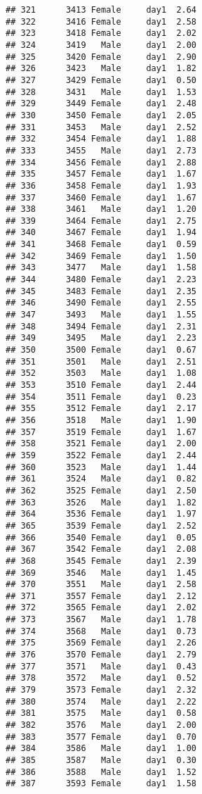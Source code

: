 \documentclass[
]{article}
\begin{document}
\begin{verbatim}
## 321      3413 Female     day1  2.64
## 322      3416 Female     day1  2.58
## 323      3418 Female     day1  2.02
## 324      3419   Male     day1  2.00
## 325      3420 Female     day1  2.90
## 326      3423   Male     day1  1.82
## 327      3429 Female     day1  0.50
## 328      3431   Male     day1  1.53
## 329      3449 Female     day1  2.48
## 330      3450 Female     day1  2.05
## 331      3453   Male     day1  2.52
## 332      3454 Female     day1  1.88
## 333      3455   Male     day1  2.73
## 334      3456 Female     day1  2.88
## 335      3457 Female     day1  1.67
## 336      3458 Female     day1  1.93
## 337      3460 Female     day1  1.67
## 338      3461   Male     day1  1.20
## 339      3464 Female     day1  2.75
## 340      3467 Female     day1  1.94
## 341      3468 Female     day1  0.59
## 342      3469 Female     day1  1.50
## 343      3477   Male     day1  1.58
## 344      3480 Female     day1  2.23
## 345      3483 Female     day1  2.35
## 346      3490 Female     day1  2.55
## 347      3493   Male     day1  1.55
## 348      3494 Female     day1  2.31
## 349      3495   Male     day1  2.23
## 350      3500 Female     day1  0.67
## 351      3501   Male     day1  2.51
## 352      3503   Male     day1  1.08
## 353      3510 Female     day1  2.44
## 354      3511 Female     day1  0.23
## 355      3512 Female     day1  2.17
## 356      3518   Male     day1  1.90
## 357      3519 Female     day1  1.67
## 358      3521 Female     day1  2.00
## 359      3522 Female     day1  2.44
## 360      3523   Male     day1  1.44
## 361      3524   Male     day1  0.82
## 362      3525 Female     day1  2.50
## 363      3526   Male     day1  1.82
## 364      3536 Female     day1  1.97
## 365      3539 Female     day1  2.52
## 366      3540 Female     day1  0.05
## 367      3542 Female     day1  2.08
## 368      3545 Female     day1  2.39
## 369      3546   Male     day1  1.45
## 370      3551   Male     day1  2.58
## 371      3557 Female     day1  2.12
## 372      3565 Female     day1  2.02
## 373      3567   Male     day1  1.78
## 374      3568   Male     day1  0.73
## 375      3569 Female     day1  2.26
## 376      3570 Female     day1  2.79
## 377      3571   Male     day1  0.43
## 378      3572   Male     day1  0.52
## 379      3573 Female     day1  2.32
## 380      3574   Male     day1  2.22
## 381      3575   Male     day1  0.58
## 382      3576   Male     day1  2.00
## 383      3577 Female     day1  0.70
## 384      3586   Male     day1  1.00
## 385      3587   Male     day1  0.30
## 386      3588   Male     day1  1.52
## 387      3593 Female     day1  1.58

\end{verbatim}
\end{document}
